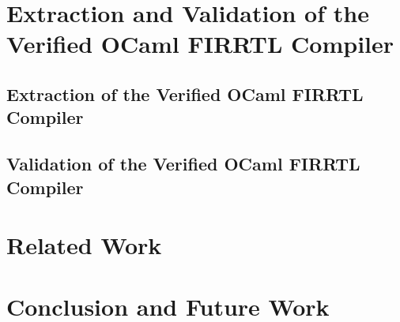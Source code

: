 \documentclass[acmsmall,review,anonymous]{acmart}%
\begin{document}




%


\section{Extraction and Validation of the Verified OCaml FIRRTL Compiler} \label{sect:ocamlcompiler}

\subsection{Extraction of the Verified OCaml FIRRTL Compiler}\label{sec-extract-compiler}




\subsection{Validation of the Verified OCaml FIRRTL Compiler}\label{sec-validate-compiler}





\section{Related Work}\label{sec-related-work}



\section{Conclusion and Future Work}\label{sec-conc}
\end{document}
